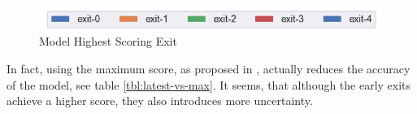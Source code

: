 \begin{figure}
	\captionsetup[subfigure]{justification=centering}
	\centering
	\includegraphics[width=.7\linewidth]{figures/edge/exit0-4_legend}
	\hfill
	\hfill
	\caption[Model Highest Scoring Exit]{Model Highest Scoring Exit}
	\label{fig:exit-highscore}
\end{figure}

In fact, using the maximum score, as proposed in \cite{kaya_shallow-deep_nodate}, actually reduces the accuracy of the model, see table \ref{tbl:latest-vs-max}. It seems, that although the early exits achieve a higher score, they also introduces more uncertainty.  

